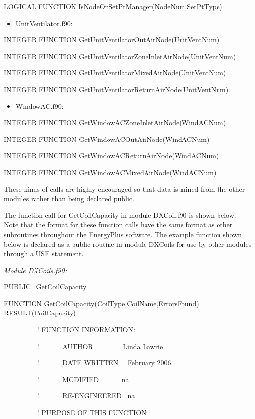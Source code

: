 LOGICAL FUNCTION IsNodeOnSetPtManager(NodeNum,SetPtType)

\begin{itemize}
\tightlist
\item
  UnitVentilator.f90:
\end{itemize}

INTEGER FUNCTION GetUnitVentilatorOutAirNode(UnitVentNum)

INTEGER FUNCTION GetUnitVentilatorZoneInletAirNode(UnitVentNum)

INTEGER FUNCTION GetUnitVentilatorMixedAirNode(UnitVentNum)

INTEGER FUNCTION GetUnitVentilatorReturnAirNode(UnitVentNum)

\begin{itemize}
\tightlist
\item
  WindowAC.f90:
\end{itemize}

INTEGER FUNCTION GetWindowACZoneInletAirNode(WindACNum)

INTEGER FUNCTION GetWindowACOutAirNode(WindACNum)

INTEGER FUNCTION GetWindowACReturnAirNode(WindACNum)

INTEGER FUNCTION GetWindowACMixedAirNode(WindACNum)

These kinds of calls are highly encouraged so that data is mined from the other modules rather than being declared public.

The function call for GetCoilCapacity in module DXCoil.f90 is shown below. Note that the format for these function calls have the same format as other subroutines throughout the EnergyPlus software. The example function shown below is declared as a public routine in module DXCoils for use by other modules through a USE statement.

\emph{Module DXCoils.f90:}

PUBLIC~ GetCoilCapacity

FUNCTION GetCoilCapacity(CoilType,CoilName,ErrorsFound) RESULT(CoilCapacity)

~~~~~~~~~ ! FUNCTION INFORMATION:

~~~~~~~~~ !~~~~~~ AUTHOR~~~~~~~~ Linda Lawrie

~~~~~~~~~ !~~~~~~ DATE WRITTEN~~ February 2006

~~~~~~~~~ !~~~~~~ MODIFIED~~~~~~ na

~~~~~~~~~ !~~~~~~ RE-ENGINEERED~ na

~~~~~~~~~ ! PURPOSE OF THIS FUNCTION:

